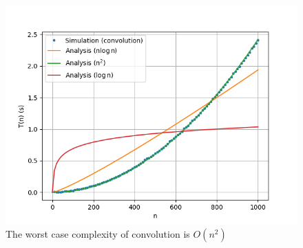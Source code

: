 \documentclass[journal,12pt,twocolumn]{IEEEtran}
\renewcommand\thesection{\arabic{section}}
\begin{document}
\begin{enumerate}[label=\thesection.\arabic*]
\begin{figure}[!htb]
	\includegraphics[width=\columnwidth]{Figures/Q6/6__7__2.png}
	\caption{The worst case complexity of convolution is $O(n^2)$}
	\label{fig:nsq}
\end{figure}
\end{enumerate}
\end{document}
